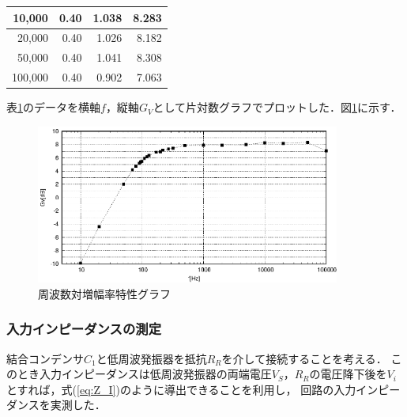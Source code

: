 \documentclass[dvipdfmx,titlepage,a4j]{jsarticle}  %
\numberwithin{equation}{section}
\begin{document}
\begin{table}[H]
\begin{center}
\begin{tabular}{r|r|r|r}
      10,000                                   & 0.40                                            & 1.038                                     & 8.283                                  \\ \hline
      20,000                                   & 0.40                                            & 1.026                                     & 8.182                                  \\ \hline
      50,000                                   & 0.40                                            & 1.041                                     & 8.308                                  \\ \hline
      100,000                                  & 0.40                                            & 0.902                                     & 7.063                                  \\ \hline
    \end{tabular}
  \end{center}
  \label{tbl:res;f-gain}
\end{table}

表\ref{tbl:res;f-gain}のデータを横軸$f$，縦軸$G_V$として片対数グラフでプロットした．図\ref{fig:f-gv.eps}に示す．

\begin{figure}[H]
  \centering
  \includegraphics[width=10cm]{../gnuplot/f-gv.eps}
  \caption{周波数対増幅率特性グラフ}
  \label{fig:f-gv.eps}
\end{figure}

\subsubsection{入力インピーダンスの測定}
結合コンデンサ$C_1$と低周波発振器を抵抗$R_R$を介して接続することを考える．
このとき入力インピーダンスは低周波発振器の両端電圧$V_S$，$R_R$の電圧降下後を$V_i$とすれば，式(\ref{eq:Z_I})のように導出できることを利用し，
回路の入力インピーダンスを実測した．
\end{document}
